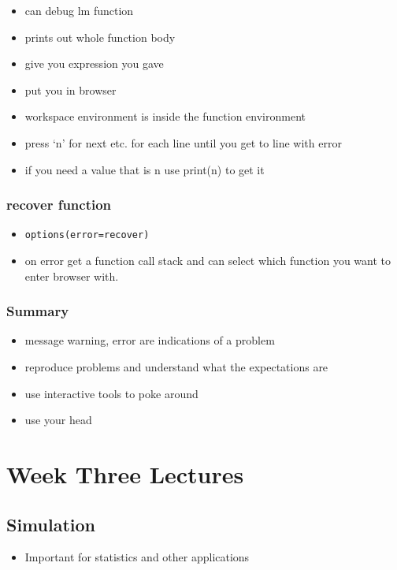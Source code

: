 \documentclass[11pt]{article}
\begin{document}
\begin{itemize}
\item can debug lm function
\item prints out whole function body
\item give you expression you gave
\item put you in browser
\item workspace environment is inside the function environment
\item press `n' for next etc. for each line until you get to line with
  error
\item if you need a value that is n use print(n) to get it
\end{itemize}
\subsubsection{recover function}
\label{sec-2-5-4}

\begin{itemize}
\item \texttt{options(error=recover)}
\item on error get a function call stack and can select which function
  you want to enter browser with.
\end{itemize}
\subsubsection{Summary}
\label{sec-2-5-5}

\begin{itemize}
\item message warning, error are indications of a problem
\item reproduce problems and understand what the expectations are
\item use interactive tools to poke around
\item use your head
\end{itemize}
 
\section{Week Three Lectures}
\label{sec-3}
\subsection{Simulation}
\label{sec-3-1}

\begin{itemize}
\item Important for statistics and other applications
\end{itemize}
\end{document}
